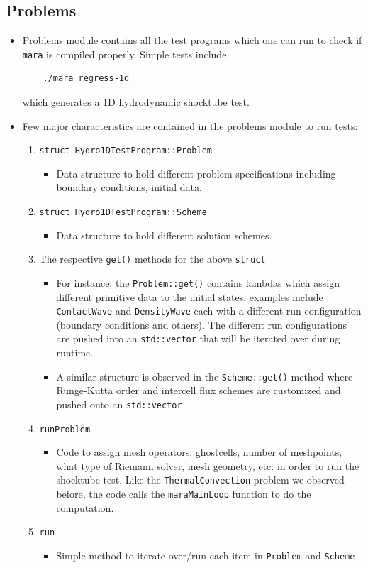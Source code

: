\documentclass{article}
\begin{document}
\subsection{Problems}
\begin{itemize}
	\item Problems module contains all the test programs which one can run to check if \texttt{mara} is compiled properly. Simple tests include 
	\begin{verbatim}
	./mara regress-1d	
	\end{verbatim}
	which generates a 1D hydrodynamic shocktube test.
	
	\item Few major characteristics are contained in the problems module to run tests:
	
	\begin{enumerate}
		\item \texttt{struct Hydro1DTestProgram::Problem}
		\begin{itemize}
			\item Data structure to hold different problem specifications including boundary conditions, initial data.
		\end{itemize}
		\item \texttt{struct Hydro1DTestProgram::Scheme}
		\begin{itemize}
			\item Data structure to hold different solution schemes.
		\end{itemize}
		\item The respective \texttt{get()} methods for the above \texttt{struct}
		\begin{itemize}
			\item For instance, the \texttt{Problem::get()} contains lambdas which assign different primitive data to the initial states. examples include \texttt{ContactWave} and \texttt{DensityWave} each with a different run configuration (boundary conditions and others). The different run configurations are pushed into an \texttt{std::vector} that will be iterated over during runtime.
			\item A similar structure is observed in the \texttt{Scheme::get()} method where Runge-Kutta order and intercell flux schemes are customized and pushed onto an \texttt{std::vector}
		\end{itemize}
		\item \texttt{runProblem}
		\begin{itemize}
			\item Code to assign mesh operators, ghostcells, number of meshpoints, what type of Riemann solver, mesh geometry, etc. in order to run the shocktube test. Like the \texttt{ThermalConvection} problem we observed before, the code calls the \texttt{maraMainLoop} function to do the computation.
		\end{itemize}
		\item \texttt{run}
		\begin{itemize}
			\item Simple method to iterate over/run each item in \texttt{Problem} and \texttt{Scheme} 
		\end{itemize}
	\end{enumerate}
	

\end{itemize}
\end{document}
